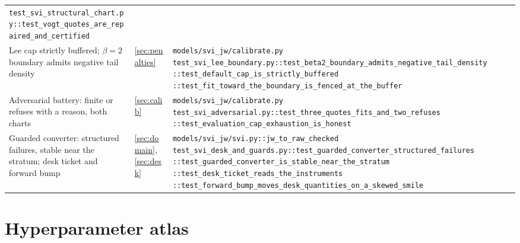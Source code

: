 \documentclass[11pt]{article}
\begin{document}
\begin{longtable}{@{}p{}p{}p{}@{}}
\nolinkurl{test_svi_structural_chart.py::test_vogt_quotes_are_repaired_and_certified}\\
\addlinespace
Lee cap strictly buffered; $\beta=2$ boundary admits negative tail density &
\cref{sec:penalties} &
\nolinkurl{models/svi_jw/calibrate.py}\newline
\nolinkurl{test_svi_lee_boundary.py::test_beta2_boundary_admits_negative_tail_density}\newline
\nolinkurl{::test_default_cap_is_strictly_buffered}\newline
\nolinkurl{::test_fit_toward_the_boundary_is_fenced_at_the_buffer}\\
\addlinespace
Adversarial battery: finite or refuses with a reason, both charts &
\cref{sec:calib} &
\nolinkurl{models/svi_jw/calibrate.py}\newline
\nolinkurl{test_svi_adversarial.py::test_three_quotes_fits_and_two_refuses}\newline
\nolinkurl{::test_evaluation_cap_exhaustion_is_honest}\\
\addlinespace
Guarded converter: structured failures, stable near the stratum; desk
ticket and forward bump &
\cref{sec:domain}, \cref{sec:desk} &
\nolinkurl{models/svi_jw/svi.py::jw_to_raw_checked}\newline
\nolinkurl{test_svi_desk_and_guards.py::test_guarded_converter_structured_failures}\newline
\nolinkurl{::test_guarded_converter_is_stable_near_the_stratum}\newline
\nolinkurl{::test_desk_ticket_reads_the_instruments}\newline
\nolinkurl{::test_forward_bump_moves_desk_quantities_on_a_skewed_smile}\\
\bottomrule
\end{longtable}
\endgroup

\appendix
\section{Hyperparameter atlas}
\label{app:atlas}
\end{document}
